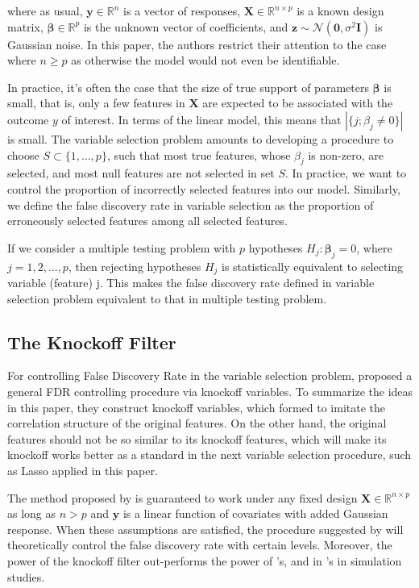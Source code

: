 \documentclass{uwstat572}
\begin{document}
where as usual, $\bm{y}\in\mathbb{R}^n$ is a vector of responses, $\bm{X}\in \mathbb{R}^{n\times p}$ is a known design matrix, $\bm{\beta}\in \mathbb{R}^p$ is the unknown vector of coefficients, and $\bm{z}\sim \mathcal{N}(\bm{0}, \sigma^2\bm{I})$ is Gaussian noise. In this paper, the authors restrict their attention to the case where $n\geq p$ as otherwise the model would not even be identifiable.

In practice, it's often the case that the size of true support of parameters $\bm{\beta}$ is small, that is, only a few features in $\bm{X}$ are expected to be associated with the outcome $y$ of interest. In terms of the linear model, this means that $|\{j; \beta_j \neq 0 \}|$ is small. The variable selection problem amounts to developing a procedure to choose $S\subset\{1,\dots, p\}$, such that most true features, whose $\beta_j$ is non-zero, are selected, and most null features are not selected in set $S$. In practice, we want to control the proportion of incorrectly selected features into our model. Similarly, we define the false discovery rate in variable selection as the proportion of erroneously selected features among all selected features.

If we consider a multiple testing problem with $p$ hypotheses $H_j: \bm{\beta}_j = 0$, where $j=1,2,\dots,p$, then rejecting hypotheses $H_j$ is statistically equivalent to selecting variable (feature) j. This makes the false discovery rate defined in variable selection problem equivalent to that in multiple testing problem. 

\subsection{The Knockoff Filter}
For controlling False Discovery Rate in the variable selection problem, \cite{barber2015controlling} proposed a general FDR controlling procedure via knockoff variables. To summarize the ideas in this paper, they construct knockoff variables, which formed to imitate the correlation structure of the original features. On the other hand, the original features should not be so similar to its knockoff features, which will make its knockoff works better as a standard in the next variable selection procedure, such as Lasso \cite{tibshirani1996regression} applied in this paper.

The method proposed by \cite{barber2015controlling} is guaranteed to work under any fixed design $\bm{X} \in \mathbb{R}^{n\times p}$ as long as $n>p$ and $\bm{y}$ is a linear function of covariates with added Gaussian response. When these assumptions are satisfied, the procedure suggested by \cite{barber2015controlling} will theoretically control the false discovery rate with certain levels. Moreover, the power of the knockoff filter out-performs the power of \cite{benjamini1995controlling}'s, and in \cite{benjamini2001control}'s in simulation studies.
\end{document}

